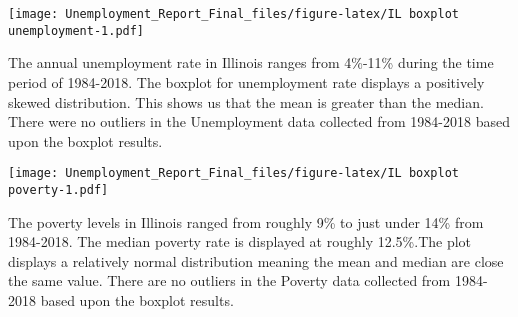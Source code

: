 \documentclass[
]{article}
\newenvironment{Shaded}{\begin{snugshade}}{\end{snugshade}}
\newcommand{\CharTok}[1]{\textcolor[rgb]{0.31,0.60,0.02}{#1}}
\newcommand{\CommentTok}[1]{\textcolor[rgb]{0.56,0.35,0.01}{\textit{#1}}}
\newcommand{\DataTypeTok}[1]{\textcolor[rgb]{0.13,0.29,0.53}{#1}}
\newcommand{\DecValTok}[1]{\textcolor[rgb]{0.00,0.00,0.81}{#1}}
\newcommand{\KeywordTok}[1]{\textcolor[rgb]{0.13,0.29,0.53}{\textbf{#1}}}
\newcommand{\NormalTok}[1]{#1}
\newcommand{\OperatorTok}[1]{\textcolor[rgb]{0.81,0.36,0.00}{\textbf{#1}}}
\newcommand{\StringTok}[1]{\textcolor[rgb]{0.31,0.60,0.02}{#1}}
\begin{document}
\begin{Shaded}
\end{Shaded}

\texttt{[image: Unemployment\_Report\_Final\_files/figure-latex/IL boxplot unemployment-1.pdf]}

The annual unemployment rate in Illinois ranges from 4\%-11\% during the
time period of 1984-2018. The boxplot for unemployment rate displays a
positively skewed distribution. This shows us that the mean is greater
than the median. There were no outliers in the Unemployment data
collected from 1984-2018 based upon the boxplot results.

\begin{Shaded}
\end{Shaded}

\texttt{[image: Unemployment\_Report\_Final\_files/figure-latex/IL boxplot poverty-1.pdf]}

The poverty levels in Illinois ranged from roughly 9\% to just under
14\% from 1984-2018. The median poverty rate is displayed at roughly
12.5\%.The plot displays a relatively normal distribution meaning the
mean and median are close the same value. There are no outliers in the
Poverty data collected from 1984-2018 based upon the boxplot results.
\end{document}
